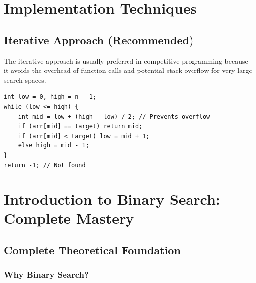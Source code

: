 \documentclass[11pt,a4paper,oneside]{book}
\begin{document}
\section{Implementation Techniques}

\subsection{Iterative Approach (Recommended)}
The iterative approach is usually preferred in competitive programming because it avoids the overhead of function calls and potential stack overflow for very large search spaces.

\begin{tcolorbox}[enhanced, colback=darkgray!5!white, colframe=darkgray, title=C++ Template]
\begin{verbatim}
int low = 0, high = n - 1;
while (low <= high) {
    int mid = low + (high - low) / 2; // Prevents overflow
    if (arr[mid] == target) return mid;
    if (arr[mid] < target) low = mid + 1;
    else high = mid - 1;
}
return -1; // Not found
\end{verbatim}
\end{tcolorbox}

\section{Introduction to Binary Search: Complete Mastery}

\subsection{Complete Theoretical Foundation}

\subsubsection{Why Binary Search?}
\end{document}
